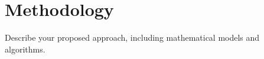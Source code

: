\section{Methodology}
Describe your proposed approach, including mathematical models and algorithms.
